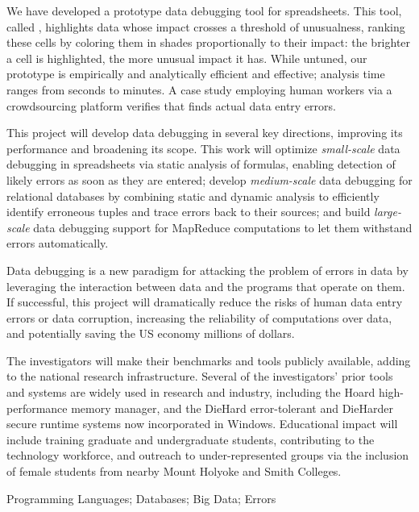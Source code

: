 We have developed a prototype data debugging tool
for spreadsheets. This tool, called
\checkcell{},
 highlights data whose impact crosses a threshold of unusualness,
ranking these cells by coloring them in shades proportionally to their
impact: the brighter a cell is highlighted, the more unusual impact it
has.  While untuned, our prototype is empirically and analytically
efficient and effective; analysis time ranges from seconds to minutes.
A case study employing human workers via a crowdsourcing platform
verifies that \checkcell{} finds actual data entry errors.

This project will develop data debugging in several key directions,
improving its performance and broadening its scope. This work will
optimize \emph{small-scale} data debugging in spreadsheets via static
analysis of formulas, enabling detection of likely errors as soon as
they are entered; develop \emph{medium-scale} data debugging for
relational databases by combining static and dynamic analysis to
efficiently identify erroneous tuples and trace errors back to their
sources; and build \emph{large-scale} data debugging support for MapReduce
computations to let them withstand errors automatically.


\smallskip
{}
Data debugging is a new paradigm for attacking the problem of errors
in data by leveraging the interaction between data and the programs
that operate on them.  If successful, this project will dramatically
reduce the risks of human data entry errors or data corruption,
increasing the reliability of computations over data, and potentially
saving the US economy millions of dollars.

The investigators will make their benchmarks and tools publicly
available, adding to the national research infrastructure. Several of
the investigators' prior tools and systems are widely used in research
and industry, including the Hoard high-performance memory manager, and the
DieHard error-tolerant and DieHarder secure runtime systems now
incorporated in Windows. Educational impact will include training
graduate and undergraduate students, contributing to the technology
workforce, and outreach to under-represented groups via the inclusion
of female students from nearby Mount Holyoke and Smith Colleges.

\smallskip
{} Programming Languages; Databases; Big Data; Errors
